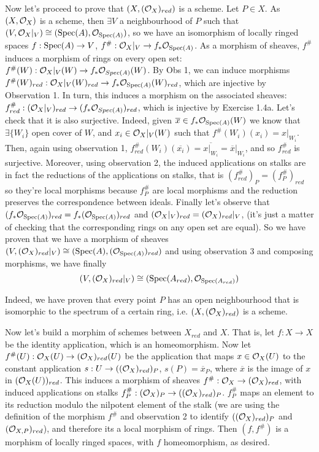 \begin{sol}
\begin{enumerate}[label=\alph*)]
		Now let's proceed to prove that $(X,(\mathcal{O}_X)_{red})$ is a scheme. Let $P \in X$. As $(X, \mathcal{O}_X)$ is a scheme, then $\exists V$ a neighbourhood of $P$ such that $(V, \mathcal{O}_X|_{V}) \cong (\mathrm{Spec}(A), \mathcal{O}_{\mathrm{Spec}(A)})$, so we have an isomorphism of locally ringed spaces $f: \mathrm{Spec}(A) \to V$, $f^{\#}: \mathcal{O}_X|_V \to f_* \mathcal{O}_{\mathrm{Spec}(A)}$. As a morphism of sheaves, $f^{\#}$ induces a morphism of rings on every open set: $f^{\#}(W): \mathcal{O}_X|_V (W) \to f_* \mathcal{O}_{Spec(A)}(W)$. By Obs 1, we can induce morphisms $f^{\#}(W)_{red}: \mathcal{O}_X|_V (W)_{red} \to f_* \mathcal{O}_{\mathrm{Spec}(A)}(W)_{red}$, which are injective by Observation 1. In turn, this induces a morphism on the associated sheaves: $f^{\#}_{red}: (\mathcal{O}_X|_V)_{red} \to (f_* \mathcal{O}_{Spec(A)})_{red}$, which is injective by Exercise 1.4a. Let's check that it is also surjective. Indeed, given $\overline{x} \in f_* \mathcal{O}_{\mathrm{Spec}(A)}(W)$ we know that $\exists \{W_i\}$ open cover of $W$, and $x_i \in \mathcal{O}_X|_V (W)$ such that $f^{\#}(W_i)(x_i) = x|_{W_i}$. Then, again using observation 1, $f^{\#}_{red}(W_i)(\overline{x_i}) = \overline{x|_{W_i}} = \overline{x}|_{W_i}$, and so $f^{\#}_{red}$ is surjective. Moreover, using observation 2, the induced applications on stalks are in fact the reductions of the applications on stalks, that is $(f^{\#}_{red})_P = (f^{\#}_P)_{red}$ so they're local morphisms because $f^{\#}_P$ are local morphisms and the reduction preserves the correspondence between ideals. Finally let's observe that $(f_* \mathcal{O}_{\mathrm{Spec}(A)})_{red} = f_*(\mathcal{O}_{\mathrm{Spec}(A)})_{red}$ and $(\mathcal{O}_X|_V)_{red} = (\mathcal{O}_X)_{red}|_{V}$, (it's just a matter of checking that the corresponding rings on any open set are equal). So we have proven that we have a morphism of sheaves $(V,(\mathcal{O}_X)_{red}|_V) \cong (\mathrm{Spec}(A), (\mathcal{O}_{\mathrm{Spec}(A)})_{red})$ and using observation 3 and composing morphisms, we have finally 
		\[
			(V,(\mathcal{O}_X)_{red}|_V) \cong (\mathrm{Spec}(A_{red}), \mathcal{O}_{\mathrm{Spec}(A_{red})})
		\]

		Indeed, we have proven that every point $P$ has an open neighbourhood that is isomorphic to the spectrum of a certain ring, i.e. $(X, (\mathcal{O}_X)_{red})$ is a scheme.

		Now let's build a morphim of schemes between $X_{red}$ and $X$. That is, let $f: X \to X$ be the identity application, which is an homeomorphism. Now let $f^{\#}(U): \mathcal{O}_X(U) \to (\mathcal{O}_X)_{red}(U)$ be the application that maps $x \in \mathcal{O}_X(U)$ to the constant application $s: U \to ((\mathcal{O}_X)_{red})_P$, $s(P) = \overline{x}_P$, where $\overline{x}$ is the image of $x$ in $(\mathcal{O}_X(U))_{red}$. This induces a morphism of sheaves $f^{\#}: \mathcal{O}_X \to (\mathcal{O}_X)_{red}$, with induced applications on stalks $f^{\#}_P: (\mathcal{O}_X)_P \to ((\mathcal{O}_X)_{red})_P$. $f^{\#}_P$ maps an element to its reduction modulo the nilpotent element of the stalk (we are using the definition of the morphism $f^{\#}$ and observation 2 to identify $((\mathcal{O}_X)_{red})_P$ and $(\mathcal{O}_{X,P})_{red}$), and therefore its a local morphism of rings. Then $(f,f^{\#})$ is a morphism of locally ringed spaces, with $f$ homeomorphism, as desired.


\end{enumerate}
\end{sol}
